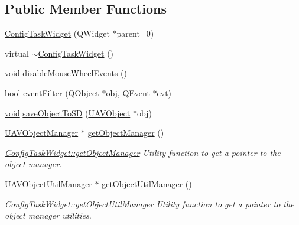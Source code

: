 \subsection*{\-Public \-Member \-Functions}
\begin{DoxyCompactItemize}
\item 
\hyperlink{group___u_a_v_object_widget_utils_ga8164338f4928bd3afd984eeda276f276}{\-Config\-Task\-Widget} (\-Q\-Widget $\ast$parent=0)
\item 
virtual \hyperlink{group___u_a_v_object_widget_utils_ga40fc17c487f66c2cbcd9aa678c6f20dd}{$\sim$\-Config\-Task\-Widget} ()
\item 
\hyperlink{group___u_a_v_objects_plugin_ga444cf2ff3f0ecbe028adce838d373f5c}{void} \hyperlink{group___u_a_v_object_widget_utils_gaf42e971c9cd69919e3b05ed25643d516}{disable\-Mouse\-Wheel\-Events} ()
\item 
bool \hyperlink{group___u_a_v_object_widget_utils_gae5859445d40d8a43d5fd91927dd56ba9}{event\-Filter} (\-Q\-Object $\ast$obj, \-Q\-Event $\ast$evt)
\item 
\hyperlink{group___u_a_v_objects_plugin_ga444cf2ff3f0ecbe028adce838d373f5c}{void} \hyperlink{group___u_a_v_object_widget_utils_ga48cc77073a67c1e1945a0625f27d1519}{save\-Object\-To\-S\-D} (\hyperlink{class_u_a_v_object}{\-U\-A\-V\-Object} $\ast$obj)
\item 
\hyperlink{class_u_a_v_object_manager}{\-U\-A\-V\-Object\-Manager} $\ast$ \hyperlink{group___u_a_v_object_widget_utils_ga516ee05a73ac3c7c9e6132b0d7294b4a}{get\-Object\-Manager} ()
\begin{DoxyCompactList}\small\item\em \hyperlink{group___u_a_v_object_widget_utils_ga516ee05a73ac3c7c9e6132b0d7294b4a}{\-Config\-Task\-Widget\-::get\-Object\-Manager} \-Utility function to get a pointer to the object manager. \end{DoxyCompactList}\item 
\hyperlink{class_u_a_v_object_util_manager}{\-U\-A\-V\-Object\-Util\-Manager} $\ast$ \hyperlink{group___u_a_v_object_widget_utils_gadefdec77400ea7aaed02de03fa044b7a}{get\-Object\-Util\-Manager} ()
\begin{DoxyCompactList}\small\item\em \hyperlink{group___u_a_v_object_widget_utils_gadefdec77400ea7aaed02de03fa044b7a}{\-Config\-Task\-Widget\-::get\-Object\-Util\-Manager} \-Utility function to get a pointer to the object manager utilities. \end{DoxyCompactList}\item 

\end{DoxyCompactItemize}
